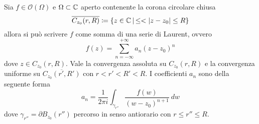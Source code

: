 \begin{theorem}
  Sia $f \in \mathcal{O}(\Omega)$ e $\Omega \subset \mathbb{C}$ aperto contenente la
  corona circolare chiusa 
  \begin{equation*}
    \overline{C_{z_0}(r,R)} \coloneqq \left\{ z \in \mathbb{C} \,\middle|\,
            \le < |z - z_0| \le R \right\}
  \end{equation*}
  allora si può scrivere $f$ come somma di una serie di Laurent, ovvero 
  \begin{equation*}
    f(z) = \sum_{n = -\infty}^{+\infty} a_n(z-z_0)^n
  \end{equation*}
  dove $z \in C_{z_0}(r,R)$. Vale la convergenza assoluta su $C_{z_0}(r,R)$ e la
  convergenza uniforme su $\overline{C_{z_0}(r',R')}$ con $r < r' < R' < R$.
  I coefficienti $a_n$ sono della seguente forma 
  \begin{equation*}
    a_n = \frac{1}{2\pi i} \int_{\gamma_{r''}} \frac{f(w)}{(w-z_0)^{n+1}}\ dw
  \end{equation*}
  dove $\gamma_{r''} = \partial B_{z_0}(r'')$ percorso in senso antiorario con
  $r \le r'' \le R$.
  \label{thr:function_as_laurent_series}
\end{theorem}
